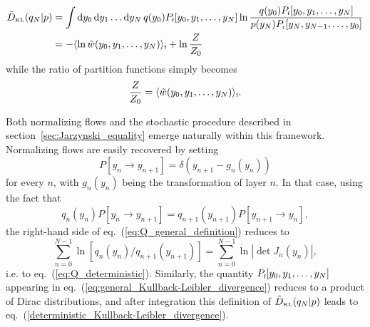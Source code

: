 \documentclass[11pt]{article}
\newcommand{\DKL}{\tilde{D}_{\mbox{\tiny{KL}}}}
\newcommand{\dd}{{\rm{d}}}
\begin{document}
\begin{align}
\label{eq:general_Kullback-Leibler_divergence}
\DKL(q_N|p) 
&= \int \dd y_0  \, \dd y_1 \dots \dd y_N \, q(y_0) P_{\mbox{\tiny{f}}}[y_0,y_1,\dots, y_N] \ln \frac{q(y_0) P_{\mbox{\tiny{f}}}[y_0,y_1,\dots, y_N]}{p(y_N) P_{\mbox{\tiny{r}}}[y_N,y_{N-1},\dots, y_0]} \\
&= - \langle \ln \tilde{w}(y_0,y_1,\dots, y_N) \rangle_{\mbox{\tiny{f}}} + \ln \frac{Z}{Z_0}
\end{align}
while the ratio of partition functions simply becomes
\begin{equation}
\label{eq:Z_final}
\frac{Z}{Z_0} = \langle \tilde{w}(y_0,y_1,\dots, y_N) \rangle_{\mbox{\tiny{f}}}.
\end{equation}

Both normalizing flows and the stochastic procedure described in section~\ref{sec:Jarzynski_equality} emerge naturally within this framework. Normalizing flows are easily recovered by setting 
\begin{equation}
P[y_n \to y_{n+1}]=\delta\left(y_{n+1}-g_n(y_n)\right)
\end{equation}
for every $n$, with $g_n(y_n)$ being the transformation of layer $n$. In that case, using the fact that
\begin{equation}
\label{Bayes_theorem}
q_n(y_n)P[y_n \to y_{n+1}] = q_{n+1}(y_{n+1})P[y_{n+1} \to y_n],
\end{equation}
the right-hand side of eq.~(\ref{eq:Q_general_definition}) reduces to 
\begin{equation}
\sum_{n=0}^{N-1} \ln \left[ q_n(y_n)/q_{n+1}(y_{n+1})\right] =\sum_{n=0}^{N-1} \ln \left| \det J_n (y_n) \right|,
\end{equation}
i.e. to eq.~(\ref{eq:Q_deterministic}). Similarly, the quantity $P_{\mbox{\tiny{f}}}[y_0,y_1,\dots, y_N]$ appearing in eq.~(\ref{eq:general_Kullback-Leibler_divergence}) reduces to a product of Dirac distributions, and after integration this definition of $\DKL(q_N|p)$ leads to eq.~(\ref{deterministic_Kullback-Leibler_divergence}).
\end{document}
